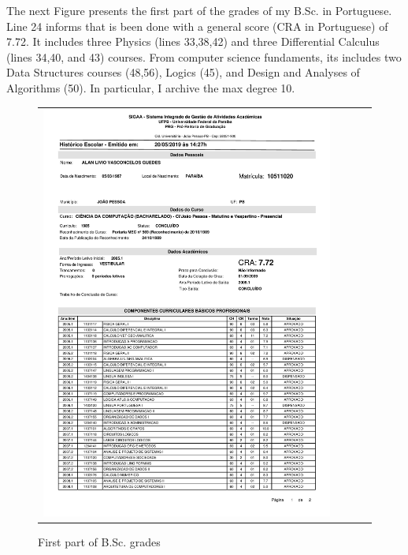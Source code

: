 \documentclass[10pt,a4paper,sans,colorlinks]{moderncv}
\begin{document}
The next Figure presents the first part of the grades of my B.Sc. in Portuguese.
Line 24 informs that is been done with a general score (CRA in Portuguese) of 7.72.
It includes three Physics (lines 33,38,42) and three Differential Calculus (lines 34,40, and 43) courses.
From computer science fundaments, its includes two Data Structures courses (48,56), Logics (45), and  Design and Analyses of Algorithms (50).
In particular, I archive the max degree 10.
\vspace{2em}
\begin{figure}
  \begin{tabularx}{\textwidth}{X p{1cm}}
    \includegraphics[align=t,width=0.92\textwidth, keepaspectratio, trim=0cm 0cm 0cm 2cm]{../static/certificates/bsc-grades.pdf}
  \end{tabularx}
  \caption{First part of B.Sc. grades}
\end{figure}

\newpage
\end{document}
